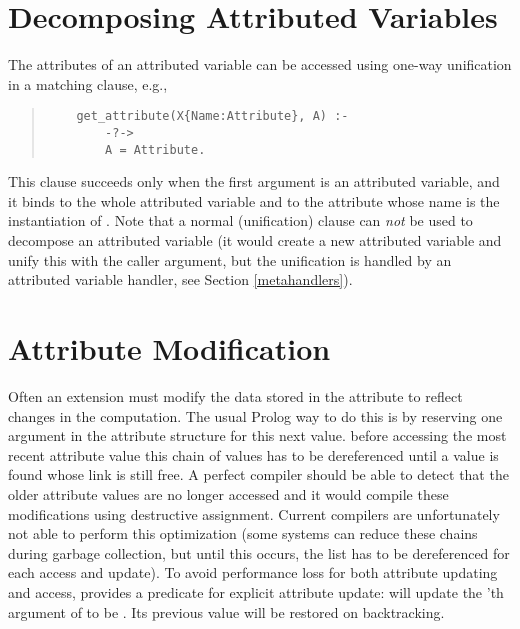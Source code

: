 \section{Decomposing Attributed Variables}
The attributes of an attributed variable can be accessed using one-way
unification in a matching clause, e.g.,
\begin{quote}
\begin{verbatim}
    get_attribute(X{Name:Attribute}, A) :-
        -?->
        A = Attribute.
\end{verbatim}
\end{quote}
This clause succeeds only when the first argument is an attributed variable,
and it binds
 to the whole attributed variable and  to the attribute
whose name is the instantiation of .
Note that a normal (unification) clause can \emph{not} be used to decompose
an attributed variable (it would create a new attributed variable and unify this
with the caller
argument, but the unification is handled by an attributed variable handler, see
Section \ref{metahandlers}).

\section{Attribute Modification}
Often an extension must modify the data stored in the
attribute to reflect changes in the computation.
The usual Prolog way to do this is by reserving
one argument in the attribute structure for this next value.
before accessing the most recent attribute value this chain
of values has to be dereferenced until a value is found whose
link is still free.
A perfect compiler should be able to detect that the older
attribute values are no longer accessed and it would compile
these modifications using destructive assignment.
Current compilers are unfortunately not able to perform
this optimization (some systems can reduce these chains
during garbage collection, but until this occurs,
the list has to be dereferenced for each access and update).
To avoid performance loss for both attribute updating and
access, {\eclipse} provides a predicate for explicit
attribute update:
 will update the
'th
argument of  to be .
Its previous value will be restored on backtracking.

